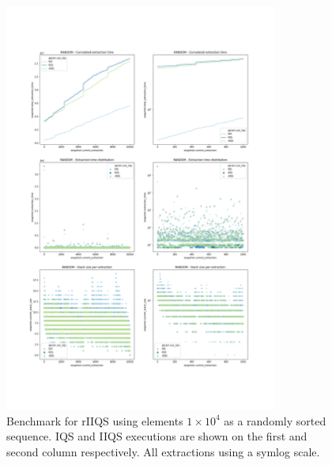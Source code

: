 \begin{figure}[!ht]
    \centering
    \includegraphics[width=0.8\textwidth]{./fragments/05_workhorse_experiment/images/01_basebenchmark_01_random_case.png}
    \caption{Benchmark for rIIQS using elements $1\times10^4$ as a randomly sorted sequence. IQS and IIQS executions are shown on the first and second column respectively. All extractions using a symlog scale.}
    \label{FIG:WORKHORSE_BENCHMARK_01}
\end{figure}

